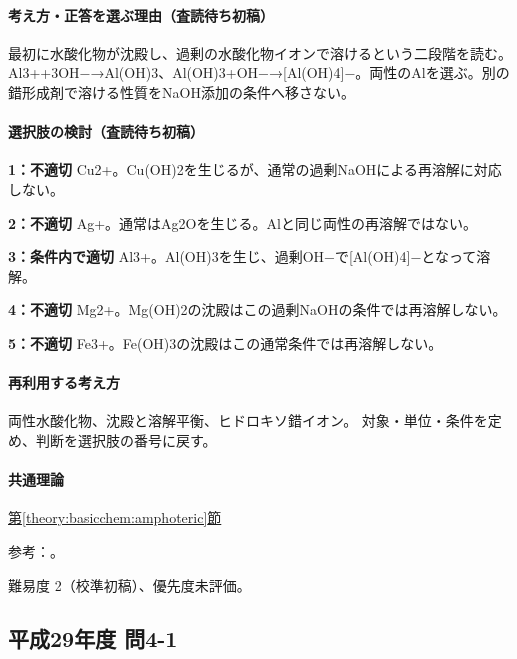 \paragraph{考え方・正答を選ぶ理由（査読待ち初稿）} 最初に水酸化物が沈殿し、過剰の水酸化物イオンで溶けるという二段階を読む。Al3++3OH−→Al(OH)3、Al(OH)3+OH−→[Al(OH)4]−。両性のAlを選ぶ。別の錯形成剤で溶ける性質をNaOH添加の条件へ移さない。

\paragraph{選択肢の検討（査読待ち初稿）}\mbox{}\par

\noindent\textbf{1：不適切} Cu2+。Cu(OH)2を生じるが、通常の過剰NaOHによる再溶解に対応しない。\par

\noindent\textbf{2：不適切} Ag+。通常はAg2Oを生じる。Alと同じ両性の再溶解ではない。\par

\noindent\textbf{3：条件内で適切} Al3+。Al(OH)3を生じ、過剰OH−で[Al(OH)4]−となって溶解。\par

\noindent\textbf{4：不適切} Mg2+。Mg(OH)2の沈殿はこの過剰NaOHの条件では再溶解しない。\par

\noindent\textbf{5：不適切} Fe3+。Fe(OH)3の沈殿はこの通常条件では再溶解しない。\par

\paragraph{再利用する考え方} 両性水酸化物、沈殿と溶解平衡、ヒドロキソ錯イオン。 対象・単位・条件を定め、判断を選択肢の番号に戻す。

\paragraph{共通理論} \hyperref[theory:basicchem:amphoteric]{第\ref*{theory:basicchem:amphoteric}節}

\par 参考：\cite{chem55_ampho}。

\par 難易度 2（校準初稿）、優先度未評価。

\subsection{平成29年度 問4-1}
\label{q:h29-reg-basic-4-1}

